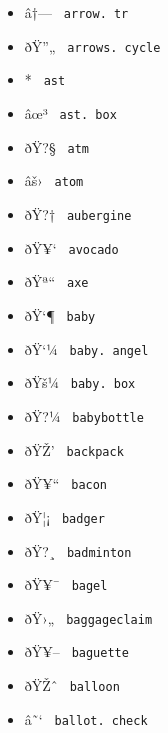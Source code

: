 \begin{itemize}
\item
  \label{symbol-arrow.tr}{{ â†--- }
  \texttt{\ arrow.\ tr\ }}
\item
  \label{symbol-arrows.cycle}{{ ðŸ''„ }
  \texttt{\ arrows.\ cycle\ }}
\item
  \label{symbol-ast}{{ * } \texttt{\ ast\ }}
\item
  \label{symbol-ast.box}{{ âœ³ } \texttt{\ ast.\ box\ }}
\item
  \label{symbol-atm}{{ ðŸ?§ } \texttt{\ atm\ }}
\item
  \label{symbol-atom}{{ âš› } \texttt{\ atom\ }}
\item
  \label{symbol-aubergine}{{ ðŸ?† }
  \texttt{\ aubergine\ }}
\item
  \label{symbol-avocado}{{ ðŸ¥` } \texttt{\ avocado\ }}
\item
  \label{symbol-axe}{{ ðŸª`` } \texttt{\ axe\ }}
\item
  \label{symbol-baby}{{ ðŸ`¶ } \texttt{\ baby\ }}
\item
  \label{symbol-baby.angel}{{ ðŸ`¼ }
  \texttt{\ baby.\ angel\ }}
\item
  \label{symbol-baby.box}{{ ðŸš¼ }
  \texttt{\ baby.\ box\ }}
\item
  \label{symbol-babybottle}{{ ðŸ?¼ }
  \texttt{\ babybottle\ }}
\item
  \label{symbol-backpack}{{ ðŸŽ' } \texttt{\ backpack\ }}
\item
  \label{symbol-bacon}{{ ðŸ¥`` } \texttt{\ bacon\ }}
\item
  \label{symbol-badger}{{ ðŸ¦¡ } \texttt{\ badger\ }}
\item
  \label{symbol-badminton}{{ ðŸ?¸ }
  \texttt{\ badminton\ }}
\item
  \label{symbol-bagel}{{ ðŸ¥¯ } \texttt{\ bagel\ }}
\item
  \label{symbol-baggageclaim}{{ ðŸ›„ }
  \texttt{\ baggageclaim\ }}
\item
  \label{symbol-baguette}{{ ðŸ¥-- }
  \texttt{\ baguette\ }}
\item
  \label{symbol-balloon}{{ ðŸŽˆ } \texttt{\ balloon\ }}
\item
  \label{symbol-ballot.check}{{ â˜` }
  \texttt{\ ballot.\ check\ }}

\end{itemize}
